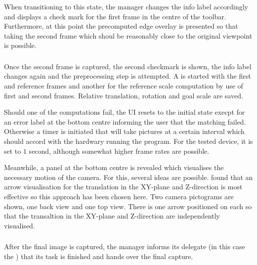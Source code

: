 When transitioning to this state, the manager changes the info label accordingly
and displays a check mark for the first frame in the centre of the toolbar.
Furthermore, at this point the precomputed edge overlay is presented so that
taking the second frame which shoul be reasonably close to the original
viewpoint is possible.

\subsubsection*{}

Once the second frame is captured, the second checkmark is shown, the info
label changes again and the preprocessing step is attempted. A
 is started with the first and reference
frames and another for the reference scale computation by use of first and
second frames. Relative translation, rotation and goal scale are saved.

Should one of the computations fail, the UI resets to the initial state execpt
for an error label at the bottom centre informing the user that the matching
failed. Otherwise a timer is initiated that will take pictures at a certain
interval which should accord with the hardwary running the program. For the
tested device, it is set to $1$ second, although somewhat higher frame rates are
possible.

Meanwhile, a panel at the bottom centre is revealed which visualises the
necessary motion of the camera. For this, several ideas are possible.
\citet{bae2010} found that an arrow visualisation for the translation in the
XY-plane and Z-direction is most effective so this approach has been chosen
here. Two camera pictograms are shown, one back view and one top view. There is
one arrow positioned on each so that the transaltion in the XY-plane and
Z-direction are independently visualised.


\subsubsection*{}

After the final image is captured, the manager informs its delegate (in this
case the ) that its task is finished and hands over
the final capture.


\subsection{}

